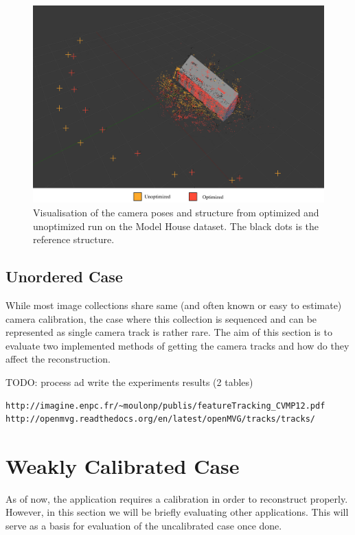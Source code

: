 \begin{figure}[!htbp]
	\begin{center}
		\includegraphics[keepaspectratio,width=\textwidth]{fig/pose_comparison2.pdf}
	\end{center}
	\caption{Visualisation of the camera poses and structure from optimized and unoptimized run on the Model House dataset. The black dots is the reference structure.}
	\label{fig:pose_comparison2}
\end{figure} 

\subsection*{Unordered Case}
While most image collections share same (and often known or easy to estimate) camera calibration, the case where this collection is sequenced and can be represented as single camera track is rather rare. The aim of this section is to evaluate two implemented methods of getting the camera tracks and how do they affect the reconstruction.

TODO:  process ad write the experiments results (2 tables)
\begin{verbatim}
http://imagine.enpc.fr/~moulonp/publis/featureTracking_CVMP12.pdf
http://openmvg.readthedocs.org/en/latest/openMVG/tracks/tracks/
\end{verbatim}
\section{Weakly Calibrated Case}
\label{sec:experiments-weakly}
As of now, the application requires a calibration in order to reconstruct properly. However, in this section we will be briefly evaluating other applications. This will serve as a basis for evaluation of the uncalibrated case once done.

